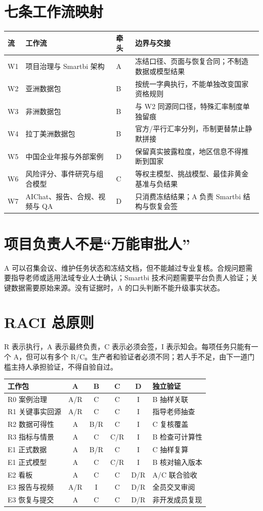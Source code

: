 \documentclass[UTF8,12pt,openany]{ctexbook}
\begin{document}
\section{七条工作流映射}
\begin{longtable}{p{1.4cm}p{4.4cm}p{2.1cm}p{5.5cm}}
\toprule
\textbf{流} & \textbf{工作流} & \textbf{牵头} & \textbf{边界与交接}\\
\midrule
W1 & 项目治理与 Smartbi 架构 & A & 冻结口径、页面与恢复合同；不制造数据或模型结果\\
W2 & 亚洲数据包 & B & 按统一字典执行，不能单独改变国家资格规则\\
W3 & 非洲数据包 & B & 与 W2 同源同口径，特殊汇率制度单独留痕\\
W4 & 拉丁美洲数据包 & B & 官方/平行汇率分列，币制更替禁止静默拼接\\
W5 & 中国企业年报与外部案例 & D & 保留真实披露粒度，地区信息不得推断到国家\\
W6 & 风险评分、事件研究与组合模型 & C & 等权主模型、挑战模型、最佳非黄金基准与负结果\\
W7 & AIChat、报告、合规、视频与 QA & D & 只消费冻结结果；A 负责 Smartbi 结构与恢复会签\\
\bottomrule
\end{longtable}

\section{项目负责人不是“万能审批人”}
A 可以召集会议、维护任务状态和冻结文档，但不能越过专业复核。合规问题需要指导老师或适用法域专业人士确认；Smartbi 技术问题需要平台负责人验证；关键数据需要原始来源。没有证据时，A 的口头判断不能升级事实状态。

\section{RACI 总原则}
R 表示执行，A 表示最终负责，C 表示必须会签，I 表示知会。每项任务只能有一个 A，但可以有多个 R/C。生产者和验证者必须不同；若人手不足，由下一道门槛主持人承担验证，不得自验自过。

\begin{longtable}{p{4.6cm}ccccp{3.7cm}}
\toprule
\textbf{工作包} & \textbf{A} & \textbf{B} & \textbf{C} & \textbf{D} & \textbf{独立验证}\\
\midrule
R0 案例治理 & A/R & C & C & I & B 抽样关联\\
R1 关键事实回源 & A/R & C & C & I & 指导老师抽查\\
R2 数据可得性 & A & B/R & C & I & C 复核覆盖\\
R3 指标与情景 & A & C & C/R & I & B 检查可计算性\\
E1 正式数据 & A & B/R & C & I & C 抽样复算\\
E1 正式模型 & A & C & C/R & I & B 核对输入版本\\
E2 看板 & A & C & C & D/R & A/C 联合验收\\
E3 报告与视频 & A/R & I & C & D/R & 全员交叉审阅\\
E3 恢复与提交 & A & C & C & D/R & 非开发成员复现\\
\bottomrule
\end{longtable}
\end{document}
